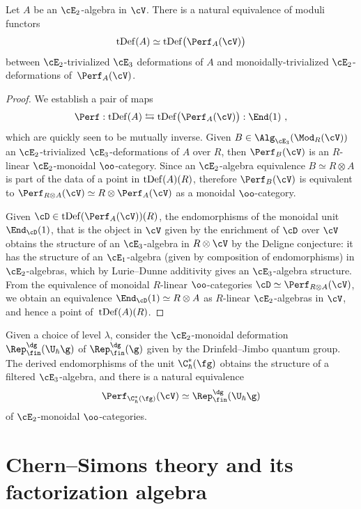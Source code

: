 \documentclass[10pt]{amsart}
\begin{document}
\begin{lmm}
Let $A$ be an $\cE_2$-algebra in $\cV$. 
There is a natural equivalence of moduli functors
\[
{\rm tDef}(A) \simeq {\rm tDef}\bigl(\Perf_A(\cV)\bigr)
\]
between $\cE_2$-trivialized $\cE_3$ deformations of $A$ and monoidally-trivialized $\cE_2$-deformations of~$\Perf_A(\cV)$.
\end{lmm}

\begin{proof}
We establish a pair of maps
\[
\Perf: {\rm tDef}(A) \leftrightarrows {\rm tDef}\bigl(\Perf_A(\cV)\bigr): \End(1)~,
\]
which are quickly seen to be mutually inverse.
Given $B\in \Alg_{\cE_3}(\Mod_R(\cV))$ an $\cE_2$-trivialized $\cE_3$-deformations of $A$ over $R$, 
then $\Perf_B(\cV)$ is an $R$-linear $\cE_2$-monoidal $\oo$-category. 
Since an $\cE_2$-algebra equivalence $B\simeq R\otimes A$ is part of the data of a point in ${\rm tDef}(A)(R)$, 
therefore $\Perf_B(\cV)$ is equivalent to $\Perf_{R\otimes A}(\cV) \simeq R\otimes\Perf_A(\cV)$ as a monoidal $\oo$-category.

Given $\cD \in {\rm tDef}(\Perf_A(\cV))(R)$, 
the endomorphisms of the monoidal unit $\End_\cD(1)$, that is the object in $\cV$ given by the enrichment of $\cD$ over $\cV$ obtains the structure of an $\cE_3$-algebra in $R\otimes \cV$ by the Deligne conjecture: it has the structure of an $\cE_1$-algebra (given by composition of endomorphisms) in $\cE_2$-algebras, which by Lurie--Dunne additivity gives an $\cE_3$-algebra structure. 
From the equivalence of monoidal $R$-linear $\oo$-categories $\cD\simeq \Perf_{R\otimes A}(\cV)$, 
we obtain an equivalence $\End_\cD(1)\simeq R\otimes A$ as $R$-linear $\cE_2$-algebras in $\cV$, 
and hence a point of~${\rm tDef}(A)(R)$.
\end{proof}


\begin{crl}\label{cor.filt.E3.q.gp}
Given a choice of level $\lambda$, consider the $\cE_2$-monoidal deformation $\Rep^{\dg}_{\fin}(\U_\hbar\g)$ of $\Rep^{\dg}_{\fin}(\g)$ given by the Drinfeld--Jimbo quantum group. 
The derived endomorphisms of the unit $\C^*_\hbar(\fg)$ obtains the structure of a filtered $\cE_3$-algebra, 
and there is a natural equivalence 
\[
\Perf_{\C^*_\hbar(\fg)}(\cV) \simeq \Rep^{\dg}_{\fin}(\U_\hbar\g)
\]
of $\cE_2$-monoidal $\oo$-categories.
\end{crl}

\section{Chern--Simons theory and its factorization algebra}
\label{sec: CS}
\end{document}
